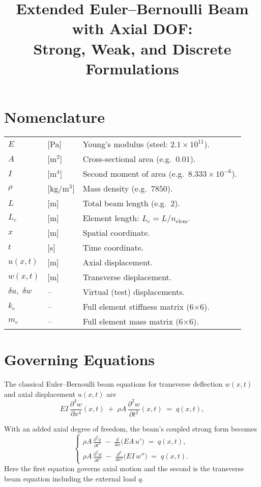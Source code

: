 \documentclass[preprint,12pt]{elsarticle}
\begin{document}
	
	\begin{frontmatter}
		
		\title{Extended Euler--Bernoulli Beam with Axial DOF:\\
			Strong, Weak, and Discrete Formulations}
		
	
	\end{frontmatter}
	
	\section*{Nomenclature}
	\begin{tabular}{p{2cm} p{1cm} p{11cm}}
		$E$           & [Pa]    & Young’s modulus (steel: $2.1\times10^{11}$).\\
		$A$           & [m$^2$] & Cross‐sectional area (e.g.\ $0.01$).\\
		$I$           & [m$^4$] & Second moment of area (e.g.\ $8.333\times10^{-6}$).\\
		$\rho$        & [kg/m$^3$]& Mass density (e.g.\ $7850$).\\
		$L$           & [m]     & Total beam length (e.g.\ $2$).\\
		$L_e$         & [m]     & Element length: $L_e=L/n_{\mathrm{elem}}$.\\
		$x$           & [m]     & Spatial coordinate.\\
		$t$           & [s]     & Time coordinate.\\
		$u(x,t)$      & [m]     & Axial displacement.\\
		$w(x,t)$      & [m]     & Transverse displacement.\\
		$\delta u,\;\delta w$ & – & Virtual (test) displacements.\\
		$k_e$         & –       & Full element stiffness matrix (6×6).\\
		$m_e$         & –       & Full element mass matrix (6×6).\\
	\end{tabular}
	
	\section{Governing Equations}
	The classical Euler–Bernoulli beam equations for transverse deflection \(w(x,t)\) and axial displacement \(u(x,t)\) are
	\[
	EI\,\frac{\partial^4w}{\partial x^4}(x,t)
	\;+\;\rho A\,\frac{\partial^2w}{\partial t^2}(x,t)
	\;=\;q(x,t),
	\tag{1}
	\]
	
	With an added axial degree of freedom, the beam’s coupled strong form becomes
	\[
	\begin{cases}
		\displaystyle
		\rho A\,\frac{\partial^2 u}{\partial t^2}
		\;-\;
		\frac{d}{dx}\bigl(EA\,u'\bigr)
		\;=\;q(x,t),
		\\[8pt]
		\displaystyle
		\rho A\,\frac{\partial^2 w}{\partial t^2}
		\;-\;
		\frac{d^2}{dx^2}\bigl(EI\,w''\bigr)
		\;=\;q(x,t).
	\end{cases}
	\tag{3}
	\]
	Here the first equation governs axial motion and the second is the transverse beam equation including the external load \(q\).
	
\end{document}
